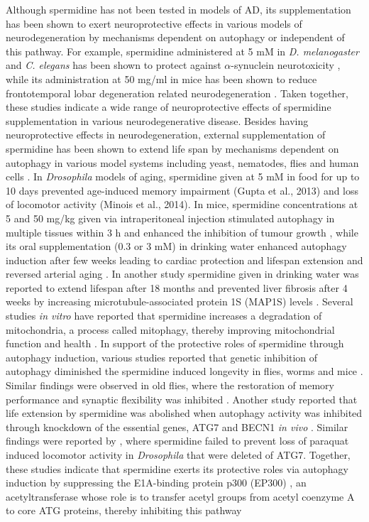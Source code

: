 Although spermidine has not been tested in models of AD, its supplementation has been shown to exert neuroprotective effects in various models of neurodegeneration  by mechanisms dependent on autophagy or independent of this pathway. For example, spermidine administered at 5 mM in \textit{D. melanogaster}  and \textit{C. elegans} has been shown to protect against $\alpha$-synuclein neurotoxicity \citep{Buttner2014}, while its administration at  50 mg/ml in mice has been shown to reduce frontotemporal lobar degeneration related neurodegeneration \citep{Wang2012}. Taken together, these studies indicate a wide range of neuroprotective effects of spermidine supplementation in various neurodegenerative disease. Besides having neuroprotective effects in neurodegeneration, external supplementation of spermidine has been shown to extend life span by mechanisms dependent on autophagy in various model systems including yeast, nematodes, flies \citep{Eisenberg2009,Minois2012,Morselli2011} and human cells \citep{Eisenberg2009,Garcia-Prat2016,Morselli2011,Pietrocola2015}. In \textit{Drosophila} models of aging, spermidine given at 5 mM in food for up to 10 days prevented age-induced memory impairment (Gupta et al., 2013) and loss of locomotor activity (Minois et al., 2014). In mice, spermidine concentrations at 5 and 50 mg/kg given via intraperitoneal injection stimulated autophagy in multiple tissues within 3 h \citep{Morselli2011,Pucciarelli2012} and enhanced the inhibition of tumour growth \citep{Pietrocola2016}, while its oral supplementation (0.3 or  3 mM) in drinking water enhanced autophagy induction after few weeks leading to cardiac protection and lifespan extension \citep{Eisenberg2016a} and reversed arterial aging \citep{LaRocca2013}. In another study spermidine given in drinking water was reported to extend lifespan after 18 months and prevented liver fibrosis after 4 weeks by increasing microtubule-associated protein 1S (MAP1S) levels \citep{Yue2017}. Several studies \textit{in vitro} have reported that spermidine increases a degradation of mitochondria, a process called mitophagy, thereby improving mitochondrial function and health \citep{Eisenberg2016a,Fan2017,Garcia-Prat2016,Qi2016}. In support of the protective roles of spermidine through autophagy induction, various studies reported that genetic inhibition of autophagy diminished the spermidine induced longevity in flies, worms \citep{Eisenberg2009} and mice \citep{Yue2017}. Similar findings were observed in old flies, where the restoration of memory performance and synaptic flexibility was inhibited \citep{Gupta2013,Gupta2016}. Another study reported that life extension by spermidine was abolished when autophagy activity was inhibited through knockdown of the essential genes, ATG7 and BECN1 \textit{in vivo} \citep{He2013}. Similar findings were reported by \citet{Minois2012}, where spermidine failed to prevent loss of paraquat induced locomotor activity in \textit{Drosophila} that were deleted of ATG7. Together, these studies indicate that spermidine exerts its protective roles via autophagy induction by suppressing the E1A-binding protein p300 (EP300) \citep{Pietrocola2015}, an acetyltransferase whose role is to transfer acetyl groups from acetyl coenzyme A to core ATG proteins, thereby inhibiting this pathway 